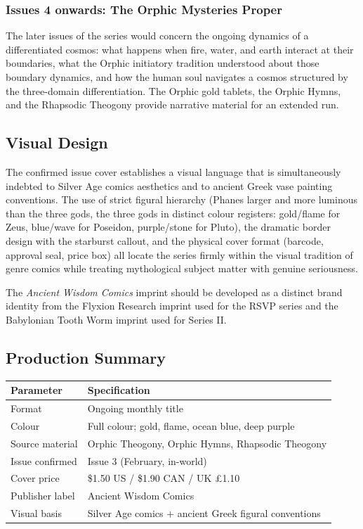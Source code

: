 \documentclass[12pt, a4paper]{article}
\begin{document}
\subsubsection{Issues 4 onwards: The Orphic Mysteries Proper}

The later issues of the series would concern the ongoing dynamics of a differentiated cosmos: what happens when fire, water, and earth interact at their boundaries, what the Orphic initiatory tradition understood about those boundary dynamics, and how the human soul navigates a cosmos structured by the three-domain differentiation. The Orphic gold tablets, the Orphic Hymns, and the Rhapsodic Theogony provide narrative material for an extended run.

\subsection{Visual Design}

The confirmed issue cover establishes a visual language that is simultaneously indebted to Silver Age comics aesthetics and to ancient Greek vase painting conventions. The use of strict figural hierarchy (Phanes larger and more luminous than the three gods, the three gods in distinct colour registers: gold/flame for Zeus, blue/wave for Poseidon, purple/stone for Pluto), the dramatic border design with the starburst callout, and the physical cover format (barcode, approval seal, price box) all locate the series firmly within the visual tradition of genre comics while treating mythological subject matter with genuine seriousness.

The \textit{Ancient Wisdom Comics} imprint should be developed as a distinct brand identity from the Flyxion Research imprint used for the RSVP series and the Babylonian Tooth Worm imprint used for Series II.

\subsection{Production Summary}

\begin{center}
\begin{tabular}{lp{9cm}}
\toprule
\textbf{Parameter} & \textbf{Specification} \\
\midrule
Format & Ongoing monthly title \\
Colour & Full colour; gold, flame, ocean blue, deep purple \\
Source material & Orphic Theogony, Orphic Hymns, Rhapsodic Theogony \\
Issue confirmed & Issue 3 (February, in-world) \\
Cover price & \$1.50 US / \$1.90 CAN / UK \pounds1.10 \\
Publisher label & Ancient Wisdom Comics \\
Visual basis & Silver Age comics + ancient Greek figural conventions \\
\bottomrule
\end{tabular}
\end{center}
\end{document}
